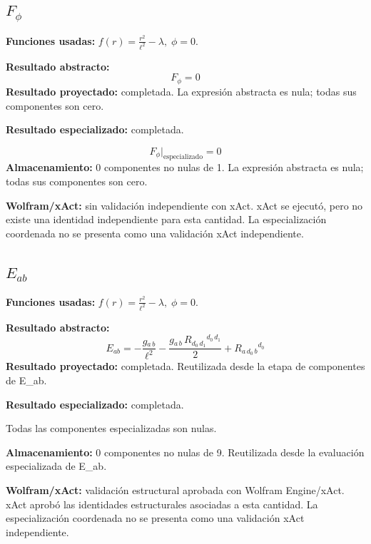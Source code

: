 \documentclass[11pt]{article}
\begin{document}
\subsection*{$ F_{\phi} $}
\textbf{Funciones usadas:} $ f\!\left(r\right) = \frac{{r}^{2}}{{\ell}^{2}} - \lambda,\;\phi=0 $.\par
\textbf{Resultado abstracto:}
\begin{dmath*}[breakdepth={5}]
F_{\phi} = 0
\end{dmath*}
\textbf{Resultado proyectado:} completada. La expresión abstracta es nula; todas sus componentes son cero.\par
\textbf{Resultado especializado:} completada.\par
\begin{dmath*}[breakdepth={5}]
F_{\phi}\big|_{\mathrm{especializado}} = 0
\end{dmath*}
\textbf{Almacenamiento:} 0 componentes no nulas de 1. La expresión abstracta es nula; todas sus componentes son cero.\par
\textbf{Wolfram/xAct:} sin validación independiente con xAct. xAct se ejecutó, pero no existe una identidad independiente para esta cantidad. La especialización coordenada no se presenta como una validación xAct independiente.\par\medskip
{}
\subsection*{$ E_{ab} $}
\textbf{Funciones usadas:} $ f\!\left(r\right) = \frac{{r}^{2}}{{\ell}^{2}} - \lambda,\;\phi=0 $.\par
\textbf{Resultado abstracto:}
\begin{dmath*}[breakdepth={5}]
E_{ab} = -\frac{g{}_{a\,b}}{{\ell}^{2}} - \frac{g{}_{a\,b}\,R{}_{d_{0}\,d_{1}}{}^{d_{0}\,d_{1}}}{2} + R{}_{a\,d_{0}\,b}{}^{d_{0}}
\end{dmath*}
\textbf{Resultado proyectado:} completada. Reutilizada desde la etapa de componentes de E\_ab.\par
\textbf{Resultado especializado:} completada.\par
Todas las componentes especializadas son nulas.\par
\textbf{Almacenamiento:} 0 componentes no nulas de 9. Reutilizada desde la evaluación especializada de E\_ab.\par
\textbf{Wolfram/xAct:} validación estructural aprobada con Wolfram Engine/xAct. xAct aprobó las identidades estructurales asociadas a esta cantidad. La especialización coordenada no se presenta como una validación xAct independiente.\par\medskip
{}
\end{document}

